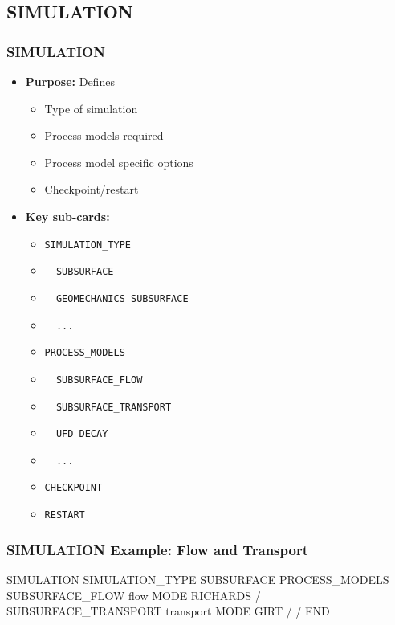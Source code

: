 \subsection{SIMULATION}

\begin{frame}\frametitle{SIMULATION}

\begin{itemize}
\item[] \textbf{Purpose:} Defines
\begin{itemize}
  \item Type of simulation
  \item Process models required
  \item Process model specific options
  \item Checkpoint/restart
\end{itemize}
\begin{comment}
\item[] \textbf{Example uses:}
\begin{itemize}
  \item
\end{itemize}
\end{comment}
\item[] \textbf{Key sub-cards:}
\begin{itemize}
\item[] \verb|SIMULATION_TYPE|
\item[] \verb|  SUBSURFACE|
\item[] \verb|  GEOMECHANICS_SUBSURFACE|
\item[] \verb|  ...|
\item[] \verb|PROCESS_MODELS|
\item[] \verb|  SUBSURFACE_FLOW|
\item[] \verb|  SUBSURFACE_TRANSPORT|
\item[] \verb|  UFD_DECAY|
\item[] \verb|  ...|
\item[] \verb|CHECKPOINT|
\item[] \verb|RESTART|
\end{itemize}
\end{itemize}

\end{frame}

\begin{frame}[fragile]\frametitle{SIMULATION Example: Flow and Transport}

\begin{semiverbatim}
SIMULATION
  SIMULATION_TYPE SUBSURFACE
  PROCESS_MODELS
    SUBSURFACE_FLOW flow
      MODE RICHARDS
    /
    SUBSURFACE_TRANSPORT transport
      MODE GIRT
    /
  /
END
\end{semiverbatim}

\end{frame}

